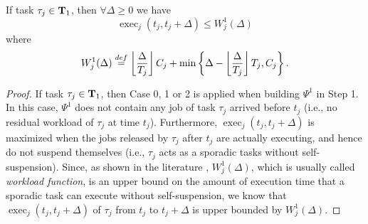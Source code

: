 \begin{Lemma}
\label{lemma:Wj1-exact}
If task $\tau_j \in {\bf T}_1$, then $\forall \Delta \geq 0$ we have 
\[
\operatorname{exec}_j(t_j, t_j+\Delta) \leq W_j^1(\Delta)
\]
where
{\footnotesize \begin{equation}
  \label{eq:execution-case1}
  W_j^1(\Delta) \stackrel{\mbox{def}}{=} \floor{\frac{\Delta}{T_j}}C_j + \min\left\{\Delta-\floor{\frac{\Delta}{T_j}}T_j, C_j\right\}.
\end{equation}}
\end{Lemma}
\begin{proof}
If task $\tau_j \in {\bf T}_1$, then Case 0, 1 or 2 is applied when building $\Psi^1$ in Step 1. %
  In this case, $\Psi^1$ does not contain any job of task $\tau_j$
  arrived before $t_j$ (i.e., no residual workload of $\tau_j$ at time $t_j$). Furthermore, $\operatorname{exec}_j(t_j, t_j+\Delta)$ is maximized when the jobs released by $\tau_j$ after $t_j$ are actually executing, and hence do not suspend themselves (i.e., $\tau_j$ acts as a sporadic tasks without self-suspension). Since, as shown in the literature \cite{bertogna2006new}, $W_j^1(\Delta)$, which is usually called \emph{workload function}, is an upper bound on the amount of execution time that a sporadic task can execute without self-suspension, we know that $\operatorname{exec}_j(t_j, t_j+\Delta)$ of $\tau_j$ from $t_j$ to $t_j+\Delta$ is upper bounded by $W_j^1(\Delta)$.
\end{proof}

